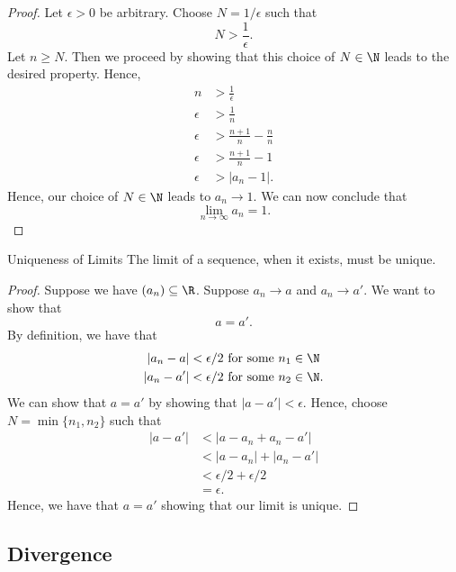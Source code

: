 \begin{proof}
Let \( \epsilon  > 0 \) be arbitrary. Choose \( N = 1 / \epsilon  \) such that 
\[ N > \frac{1}{ \epsilon }.\]
Let \( n \geq N \). Then we proceed by showing that this choice of \( N \in \N \) leads to the desired property. 
Hence, 
\begin{align*}
n &> \frac{1}{ \epsilon } \\
\epsilon &> \frac{1}{ n } \\
\epsilon  &> \frac{ n+1 }{n} - \frac{n}{n} \\ 
\epsilon &> \frac{n+1}{n} - 1 \\
\epsilon  &> |a_n - 1|.
\end{align*}
Hence, our choice of \( N \in \N \) leads to \( a_n \to 1 \). We can now conclude that 
\[ \lim_{n \to \infty} a_n = 1.\]
\end{proof}

\begin{theorem}{Uniqueness of Limits}{}
The limit of a sequence, when it exists, must be unique.
\end{theorem}

\begin{proof}
Suppose we have \( (a_n) \subseteq \R \). Suppose \( a_n \to a \) and \( a_n \to a' \). We want to show that 
\[ a = a' .  \]
By definition, we have that 
\begin{align*}
    |a_n - a |&< \epsilon/2   \text{ for some } n_1 \in \N \\
    |a_n - a'| &< \epsilon/2 \text{ for some } n_2 \in \N .
\end{align*}
We can show that \( a = a' \) by showing that \( |a - a'| < \epsilon\). Hence, choose \( N = \min \{ n_1, n_2 \}\) such that 
\begin{align*}
 |a - a'|&< |a - a_n + a_n - a' |  \\
         &< |a - a_n | + |a_n - a'| \\
         &< \epsilon/2 + \epsilon/2 \\
         &= \epsilon.
\end{align*}
Hence, we have that \( a = a' \) showing that our limit is unique. 
\end{proof}



\subsection{Divergence}

